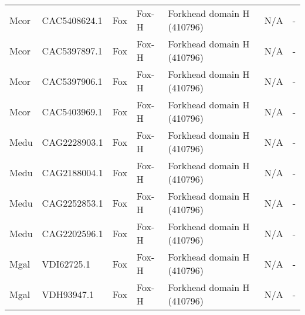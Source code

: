 \documentclass[../main.tex]{subfiles}
\begin{document}
\begin{landscape}
\begin{longtable}{lllllll}
		Mcor           & CAC5408624.1          & Fox            & Fox-H               & Forkhead domain H (410796)                  & N/A                                                                    & -                    \\
		Mcor           & CAC5397897.1          & Fox            & Fox-H               & Forkhead domain H (410796)                  & N/A                                                                    & -                    \\
		Mcor           & CAC5397906.1          & Fox            & Fox-H               & Forkhead domain H (410796)                  & N/A                                                                    & -                    \\
		Mcor           & CAC5403969.1          & Fox            & Fox-H               & Forkhead domain H (410796)                  & N/A                                                                    & -                    \\
		Medu           & CAG2228903.1          & Fox            & Fox-H               & Forkhead domain H (410796)                  & N/A                                                                    & -                    \\
		Medu           & CAG2188004.1          & Fox            & Fox-H               & Forkhead domain H (410796)                  & N/A                                                                    & -                    \\
		Medu           & CAG2252853.1          & Fox            & Fox-H               & Forkhead domain H (410796)                  & N/A                                                                    & -                    \\
		Medu           & CAG2202596.1          & Fox            & Fox-H               & Forkhead domain H (410796)                  & N/A                                                                    & -                    \\
		Mgal           & VDI62725.1            & Fox            & Fox-H               & Forkhead domain H (410796)                  & N/A                                                                    & -                    \\
		Mgal           & VDH93947.1            & Fox            & Fox-H               & Forkhead domain H (410796)                  & N/A                                                                    & -                    \\

\end{longtable}
\end{landscape}
\end{document}
